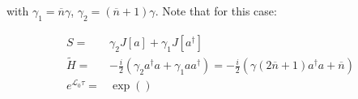with $\gamma_{1} = \overline{n}\gamma$, $\gamma_{2} = (\overline{n}+1)\gamma$. Note that for this case:

\begin{align}
S =& \gamma_{2}J[a] + \gamma_{1}J[a^{\dagger}]\\
  \tilde{H} =&  - \frac{i}{2}\left(\gamma_{2}a^{\dagger}a + \gamma_{1}aa^{\dagger}\right)=-\frac{i}{2}\left(\gamma (2\overline{n}+1)a^{\dagger}a+\overline{n} \right) \\
  e^{\mathcal{L}_{0}\tau}=& \exp\left(\right)
\end{align}


